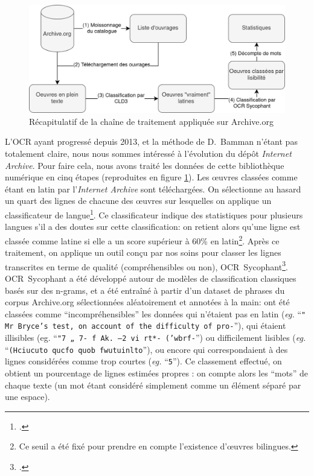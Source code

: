 \begin{figure}
    \centering
    \includegraphics[width=.8\linewidth]{figures/chap1/part1/ocrSycophant.png}
    \caption{Récapitulatif de la chaîne de traitement appliquée sur Archive.org}
    \label{fig:chap1:workflow-sycophant}
\end{figure}

L'OCR ayant progressé depuis 2013, et la méthode de D.~Bamman n'étant pas totalement claire, nous nous sommes intéressé à l'évolution du dépôt \textit{Internet Archive}. Pour faire cela, nous avons traité les données de cette bibliothèque numérique en cinq étapes (reproduites en figure \ref{fig:chap1:workflow-sycophant}). Les œuvres classées comme étant en latin par l'\textit{Internet Archive} sont téléchargées. On sélectionne au hasard un quart des lignes de chacune des œuvres sur lesquelles on applique un classificateur de langue\footcite{salcianu2018compact}. 
Ce classificateur indique des statistiques pour plusieurs langues s'il a des doutes sur cette classification: on retient alors qu'une ligne est classée comme latine si elle a un score supérieur à 60\% en latin\footnote{Ce seuil a été fixé pour prendre en compte l'existence d'œuvres bilingues.}. Après ce traitement, on applique un outil conçu par nos soins pour classer les lignes transcrites en terme de qualité (compréhensibles ou non), OCR~Sycophant\footcite{Clerice_OCR_Sycophant_2021}. OCR~Sycophant a été développé autour de modèles de classification classiques basés sur des n-grams, et a été entraîné à partir d'un dataset de phrases du corpus Archive.org sélectionnées aléatoirement et annotées à la main: ont été classées comme ``incompréhensibles'' les données qui n'étaient pas en latin (\textit{eg.} ``\texttt{" Mr Bryce's test, on account of the difficulty of pro-}''), qui étaient illisibles (eg. ``\texttt{"7 „ 7- f Ak. —2 vi rt*- ('wbrf-}'') ou difficilement lisibles (\textit{eg.} ``\texttt{(Hciucuto qucfo quob fwutuinlto}''), ou encore qui correspondaient à des lignes considérées comme trop courtes (\textit{eg.} ``\texttt{5}''). Ce classement effectué, on obtient un pourcentage de lignes estimées propres : on compte alors les \enquote{mots} de chaque texte (un mot étant considéré simplement comme un élément séparé par une espace).

